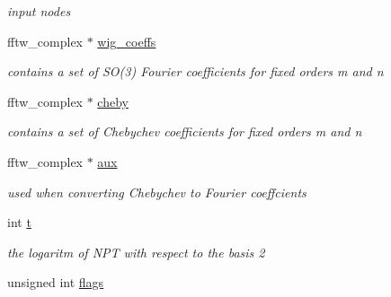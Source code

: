\begin{DoxyCompactItemize}
\begin{DoxyCompactList}\small\item\em input nodes \end{DoxyCompactList}\item 
\hypertarget{structnfsoft__plan___af6fb25c58e986915105c73009bdaa35c}{fftw\-\_\-complex $\ast$ \hyperlink{structnfsoft__plan___af6fb25c58e986915105c73009bdaa35c}{wig\-\_\-coeffs}}\label{structnfsoft__plan___af6fb25c58e986915105c73009bdaa35c}

\begin{DoxyCompactList}\small\item\em contains a set of S\-O(3) Fourier coefficients for fixed orders m and n \end{DoxyCompactList}\item 
\hypertarget{structnfsoft__plan___a729b20c0d30b649d6bff36734d34af7f}{fftw\-\_\-complex $\ast$ \hyperlink{structnfsoft__plan___a729b20c0d30b649d6bff36734d34af7f}{cheby}}\label{structnfsoft__plan___a729b20c0d30b649d6bff36734d34af7f}

\begin{DoxyCompactList}\small\item\em contains a set of Chebychev coefficients for fixed orders m and n \end{DoxyCompactList}\item 
\hypertarget{structnfsoft__plan___ae31e501405bebb72dcfe9831b34be76c}{fftw\-\_\-complex $\ast$ \hyperlink{structnfsoft__plan___ae31e501405bebb72dcfe9831b34be76c}{aux}}\label{structnfsoft__plan___ae31e501405bebb72dcfe9831b34be76c}

\begin{DoxyCompactList}\small\item\em used when converting Chebychev to Fourier coeffcients \end{DoxyCompactList}\item 
\hypertarget{structnfsoft__plan___ab0b32ee063950ce38adc6b0e5e40af02}{int \hyperlink{structnfsoft__plan___ab0b32ee063950ce38adc6b0e5e40af02}{t}}\label{structnfsoft__plan___ab0b32ee063950ce38adc6b0e5e40af02}

\begin{DoxyCompactList}\small\item\em the logaritm of N\-P\-T with respect to the basis 2 \end{DoxyCompactList}\item 
\hypertarget{structnfsoft__plan___aad410ed6425a055fc9b948cfe0df2cca}{unsigned int \hyperlink{structnfsoft__plan___aad410ed6425a055fc9b948cfe0df2cca}{flags}}\label{structnfsoft__plan___aad410ed6425a055fc9b948cfe0df2cca}


\end{DoxyCompactItemize}
